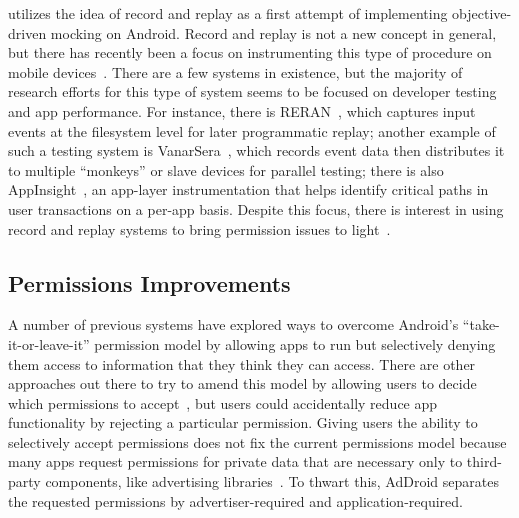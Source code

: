 \PocketMocker{} utilizes the idea of record and replay as a first attempt of
implementing objective-driven mocking on Android. Record and replay is not a
new concept in general, but there has recently been a focus on instrumenting
this type of procedure on mobile devices~\cite{recordreplay-hotmobile11}.
There are a few systems in existence, but the majority of research efforts
for this type of system seems to be focused on developer testing and
app performance. For instance, there is RERAN~\cite{gomez2013reran},
which captures input events at the filesystem level for later programmatic
replay; another example of such a testing system is
VanarSera~\cite{vanarsena-mobisys14}, which records event data then
distributes it to multiple ``monkeys'' or slave devices for parallel testing;
there is also AppInsight~\cite{appinsight-osdi12}, an app-layer
instrumentation that helps identify critical paths in user transactions on a
per-app basis. Despite this focus, there is interest in using record and
replay systems to bring permission issues to light~\cite{permissions-spsm12}.


\subsection{Permissions Improvements}

A number of previous systems have explored ways to overcome Android's
``take-it-or-leave-it'' permission model by allowing apps to run but
selectively denying them access to information that they think they can
access. There are other approaches out there to try to amend this model by
allowing users to decide which permissions to accept~\cite{apex-asiaccs10},
but users could accidentally reduce app functionality by rejecting a
particular permission. Giving users the ability to selectively accept
permissions does not fix the current permissions model because many
apps request permissions for private data that are necessary only to
third-party components, like advertising libraries~\cite{addroid-asiaccs12}.
To thwart this, AdDroid separates the requested permissions by
advertiser-required and application-required.
